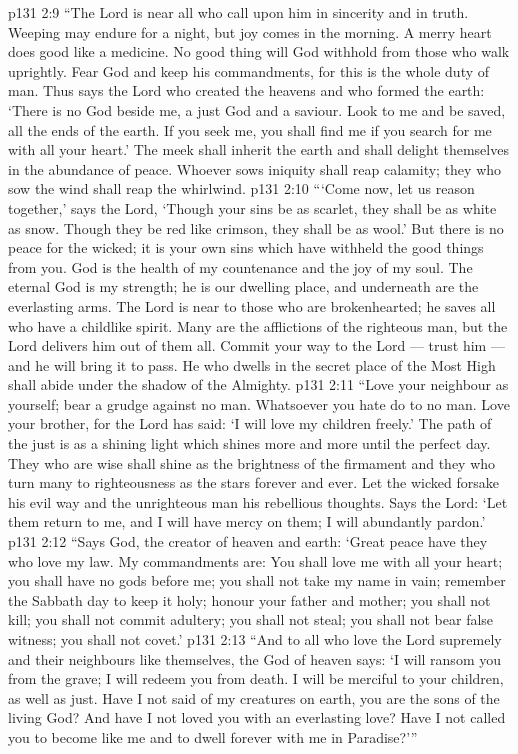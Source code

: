 \vs p131 2:9 “The Lord is near all who call upon him in sincerity and in truth. Weeping may endure for a night, but joy comes in the morning. A merry heart does good like a medicine. No good thing will God withhold from those who walk uprightly. Fear God and keep his commandments, for this is the whole duty of man. Thus says the Lord who created the heavens and who formed the earth: ‘There is no God beside me, a just God and a saviour. Look to me and be saved, all the ends of the earth. If you seek me, you shall find me if you search for me with all your heart.’ The meek shall inherit the earth and shall delight themselves in the abundance of peace. Whoever sows iniquity shall reap calamity; they who sow the wind shall reap the whirlwind.
\vs p131 2:10 “‘Come now, let us reason together,’ says the Lord, ‘Though your sins be as scarlet, they shall be as white as snow. Though they be red like crimson, they shall be as wool.’ But there is no peace for the wicked; it is your own sins which have withheld the good things from you. God is the health of my countenance and the joy of my soul. The eternal God is my strength; he is our dwelling place, and underneath are the everlasting arms. The Lord is near to those who are brokenhearted; he saves all who have a childlike spirit. Many are the afflictions of the righteous man, but the Lord delivers him out of them all. Commit your way to the Lord --- trust him --- and he will bring it to pass. He who dwells in the secret place of the Most High shall abide under the shadow of the Almighty.
\vs p131 2:11 “Love your neighbour as yourself; bear a grudge against no man. Whatsoever you hate do to no man. Love your brother, for the Lord has said: ‘I will love my children freely.’ The path of the just is as a shining light which shines more and more until the perfect day. They who are wise shall shine as the brightness of the firmament and they who turn many to righteousness as the stars forever and ever. Let the wicked forsake his evil way and the unrighteous man his rebellious thoughts. Says the Lord: ‘Let them return to me, and I will have mercy on them; I will abundantly pardon.’
\vs p131 2:12 “Says God, the creator of heaven and earth: ‘Great peace have they who love my law. My commandments are: You shall love me with all your heart; you shall have no gods before me; you shall not take my name in vain; remember the Sabbath day to keep it holy; honour your father and mother; you shall not kill; you shall not commit adultery; you shall not steal; you shall not bear false witness; you shall not covet.’
\vs p131 2:13 “And to all who love the Lord supremely and their neighbours like themselves, the God of heaven says: ‘I will ransom you from the grave; I will redeem you from death. I will be merciful to your children, as well as just. Have I not said of my creatures on earth, you are the sons of the living God? And have I not loved you with an everlasting love? Have I not called you to become like me and to dwell forever with me in Paradise?’”
